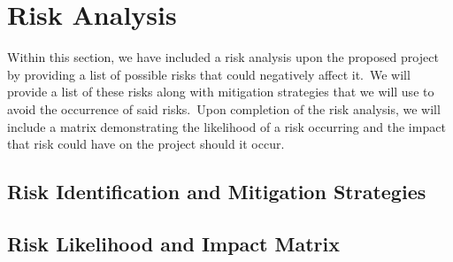 \chapter{Risk Analysis} \label{ch:risk}

    Within this section, we have included a risk analysis upon the proposed project by providing a list of possible risks
    that could negatively affect it.\ We will provide a list of these risks along with mitigation strategies that we will
    use to avoid the occurrence of said risks.\ Upon completion of the risk analysis, we will include a matrix
    demonstrating the likelihood of a risk occurring and the impact that risk could have on the project should it occur.

	\section{Risk Identification and Mitigation Strategies}

    	\vspace{3em}  \vspace{6em}

	\section{Risk Likelihood and Impact Matrix}

		\vspace{3em} 
